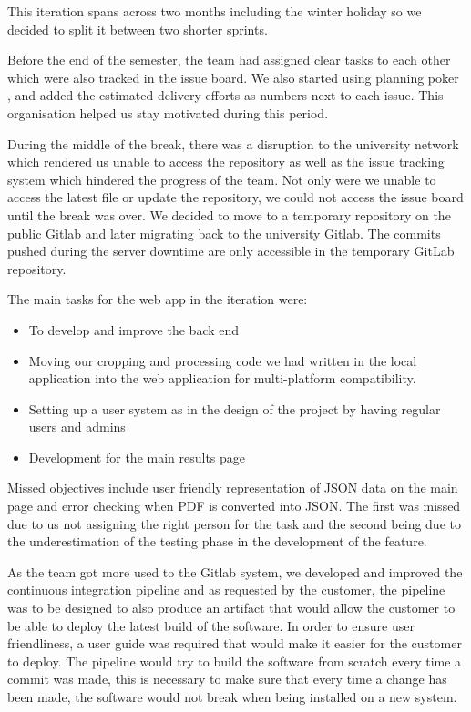 \documentclass{l3proj}
\begin{document}
This iteration spans across two months including the winter holiday so we decided to split it between two shorter sprints. 

Before the end of the semester, the team had assigned clear tasks to each other which were also tracked in the issue board. We also started using planning poker \cite{MikeAgile} , and added the estimated delivery efforts as numbers next to each issue. This organisation helped us stay motivated during this period. 

During the middle of the break, there was a disruption to the university network which rendered us unable to access the repository as well as the issue tracking system which hindered the progress of the team. Not only were we unable to access the latest file or update the repository, we could not access the issue board until the break was over. We decided to move to a temporary repository on the public Gitlab and later migrating back to the university Gitlab. The commits pushed during the server downtime are only accessible in the temporary GitLab repository.

The main tasks for the web app in the iteration were:
\begin{itemize}
\item To develop and improve the back end
\item Moving our cropping and processing code we had written in the local application into the web application for multi-platform compatibility.
\item Setting up a user system as in the design of the project by having regular users and admins
\item Development for the main results page
\end{itemize}

Missed objectives include user friendly representation of JSON data on the main page and error checking when PDF is converted into JSON. The first was missed due to us not assigning the right person for the task and the second being due to the underestimation of the testing phase in the development of the feature.

As the team got more used to the Gitlab system, we developed and improved the continuous integration pipeline and as requested by the customer, the pipeline was to be designed to also produce an artifact that would allow the customer to be able to deploy the latest build of the software. In order to ensure user friendliness, a user guide was required that would make it easier for the customer to deploy. The pipeline would try to build the software from scratch every time a commit was made, this is necessary to make sure that every time a change has been made, the software would not break when being installed on a new system.
\end{document}
